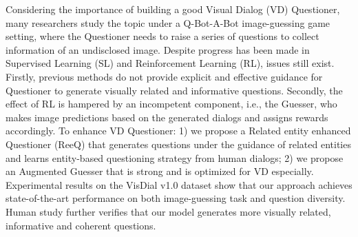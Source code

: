 Considering the importance of building a good Visual Dialog (VD) Questioner, many researchers study the topic under a Q-Bot-A-Bot image-guessing game setting, where the Questioner needs to raise a series of questions to collect information of an undisclosed image. Despite progress has been made in Supervised Learning (SL) and Reinforcement Learning (RL), issues still exist. Firstly, previous methods do not provide explicit and effective guidance for Questioner to generate visually related and informative questions. Secondly, the effect of RL is hampered by an incompetent component, i.e., the Guesser, who makes image predictions based on the generated dialogs and assigns rewards accordingly. To enhance VD Questioner: 1) we propose a Related entity enhanced Questioner (ReeQ) that generates questions under the guidance of related entities and learns entity-based questioning strategy from human dialogs; 2) we propose an Augmented Guesser that is strong and is optimized for VD especially. Experimental results on the VisDial v1.0 dataset show that our approach achieves state-of-the-art performance on both image-guessing task and question diversity. Human study further verifies that our model generates more visually related, informative and coherent questions.
